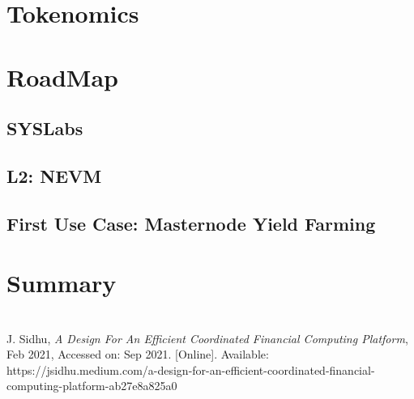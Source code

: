 \documentclass[peerreview]{ieeesyscoin}
\begin{document}
\section{Tokenomics}
\label{sec:tokenomics}

\lipsum[2-4]

\section{RoadMap}
\label{sec:roadmap}

\subsection{SYSLabs}

\lipsum[1]

\subsection{L2: NEVM}

\lipsum[1]

\subsection{First Use Case: Masternode Yield Farming}

\lipsum[1]

\section{Summary}
\label{section:summary}
\lipsum[1]

\appendices

\section{}

\lipsum[1]

\begin{thebibliography}{00}

 J. Sidhu, \textit{A Design For An Efficient Coordinated Financial Computing Platform}, Feb 2021, Accessed on: Sep 2021.  [Online]. Available:  https://jsidhu.medium.com/a-design-for-an-efficient-coordinated-financial-computing-platform-ab27e8a825a0



\end{thebibliography}


\EOD
\end{document}
